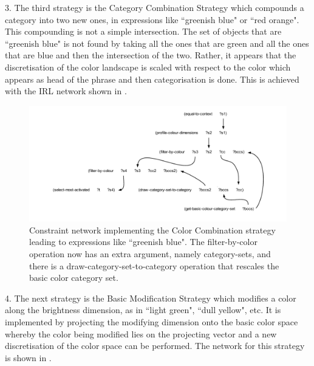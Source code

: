 3. The third strategy is the {\bfshape Category Combination Strategy} which compounds a category into two new ones, in 
expressions like ``greenish blue" or ``red orange". This compounding is not a simple intersection. The set of objects  
that are ``greenish blue" is not found by taking all the ones that are green and all the ones that are blue and then 
the intersection of the two. Rather, it appears that the discretisation of the color landscape is scaled with respect 
to the color which appears as head of the phrase and then categorisation is done. This is achieved with the IRL network 
shown in . 

\begin{figure}[htbp]
  \centerline{\includegraphics[width=1.0\textwidth]{chap11/figs/combi}}
\caption{\label{fig:combi} 
Constraint network implementing the Color Combination strategy leading to expressions like ``greenish blue". 
The filter-by-color operation now has an extra argument, namely category-sets,  
and there is a draw-category-set-to-category operation that rescales the basic color category set.}
\end{figure}

4. The next strategy is the {\bfshape Basic Modification Strategy} which modifies a color along the brightness dimension, as in 
``light green", ``dull yellow", etc. It is implemented by projecting the modifying dimension onto the basic color space 
whereby the color being modified lies on the projecting vector and a new discretisation of the color space can be 
performed. The network for this strategy is shown in . 

